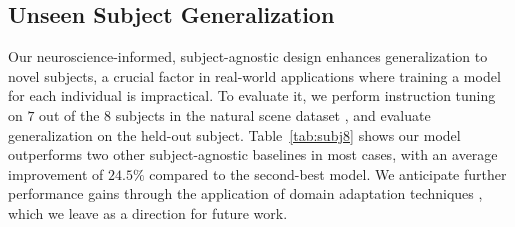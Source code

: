 \subsection{Unseen Subject Generalization}
Our neuroscience-informed, subject-agnostic design enhances generalization to novel subjects, a crucial factor in real-world applications where training a model for each individual is impractical. To evaluate it, we perform instruction tuning on $7$ out of the $8$ subjects in the natural scene dataset \citep{allen2022massive}, and evaluate generalization on the held-out subject. Table~\ref{tab:subj8} shows our model outperforms two other subject-agnostic baselines in most cases, with an average improvement of $24.5\%$ compared to the second-best model. We anticipate further performance gains through the application of domain adaptation techniques \citep{xiao2023spa,ganin2015unsupervised,ganin2016domain,gong2012geodesic}, which we leave as a direction for future work.

